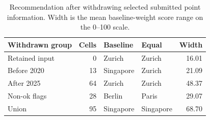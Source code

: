 \begin{table}[!ht]\centering
\caption{Recommendation after withdrawing selected submitted point information. Width is the mean baseline-weight score range on the 0--100 scale.}\label{tab:vintage}
\begin{tabular}{l r l l r}\toprule
Withdrawn group & Cells & Baseline & Equal & Width\\\midrule
Retained input & 0 & Zurich & Zurich & 16.01 \\
Before 2020 & 13 & Singapore & Zurich & 21.09 \\
After 2025 & 64 & Zurich & Zurich & 48.37 \\
Non-ok flags & 28 & Berlin & Paris & 29.07 \\
Union & 95 & Singapore & Singapore & 68.70 \\
\bottomrule\end{tabular}\end{table}
